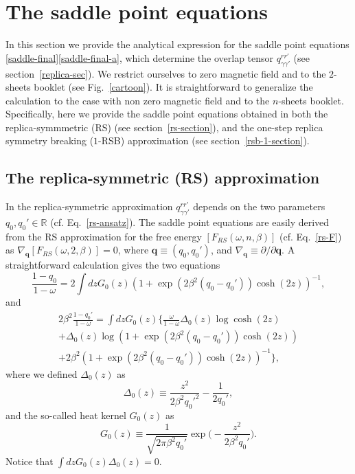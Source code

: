 \documentclass[twocolumn,superscriptaddress,prb,10pt]{revtex4-1}
\begin{document}
\appendix

\section{The saddle point equations} 
\label{saddle-equations}

In this section we provide the analytical expression for the saddle point equations 
\eqref{saddle-final}\eqref{saddle-final-a}, which determine the overlap tensor 
$q_{\gamma\gamma'}^{rr'}$ (see section~\ref{replica-sec}). We restrict ourselves 
to zero magnetic field and to the $2$-sheets booklet (see Fig.~\ref{cartoon}). It is 
straightforward to generalize the calculation to the case with non zero magnetic 
field and to the $n$-sheets booklet. Specifically, here we provide the saddle point 
equations obtained in both the replica-symmmetric (RS) (see section~\ref{rs-section}), 
and the one-step replica symmetry breaking ($1$-RSB) approximation (see 
section~\ref{rsb-1-section}). 

\subsection{The replica-symmetric (RS) approximation}

In the replica-symmetric approximation $q_{\gamma\gamma'}^{rr'}$ depends on the two 
parameters $q_0,q_0'\in\mathbb{R}$ (cf. Eq.~\eqref{rs-ansatz}). The saddle point 
equations are easily derived from the RS approximation for the free energy $[F_{RS}
(\omega,n,\beta)]$ (cf. Eq.~\eqref{rs-F}) as $\nabla_{\mathbf{q}}[F_{RS}(\omega,2,
\beta)]=0$, where $\mathbf{q}\equiv(q_0,q_0')$, and $\nabla_{\mathbf{q}}\equiv
\partial/\partial\mathbf{q}$. A straightforward calculation gives the two equations 
%
\begin{equation}
\label{RS-saddle-1}
\frac{1-q_0}{1-\omega}=2\int dz G_0(z)(1+\exp(2\beta^2(q_0-q_0'))\cosh(2z))^{-1},
\end{equation}
%
and
%
\begin{multline}
\label{RS-saddle-2}
2\beta^2\frac{1-q_0'}{1-\omega}=
\int dz G_0(z)\Big\{\frac{\omega}{1-\omega}\Delta_0(z)
\log\cosh(2z)\\
+\Delta_0(z)\log(1+\exp(2\beta^2(q_0-q_0'))\cosh(2z))\\
+2\beta^2(1+\exp(2\beta^2(q_0-q_0'))\cosh(2z))^{-1}
\Big\},
\end{multline}
%
where we defined $\Delta_0(z)$ as 
%
\begin{equation}
\Delta_0(z)\equiv\frac{z^2}{2\beta^2q_0'^2}-\frac{1}{2q_0'},
\end{equation}
%
and the so-called heat kernel $G_0(z)$ as 
%
\begin{equation}
G_0(z)\equiv\frac{1}{\sqrt{2\pi \beta^2 q_0'}}\exp\Big(-\frac{z^2}
{2\beta^2 q_0'}\Big).
\end{equation}
%
Notice that $\int dz G_0(z)\Delta_0(z)=0$.
\end{document}
